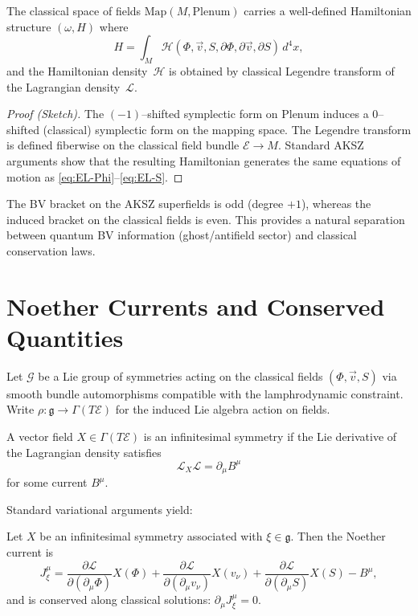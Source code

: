 \begin{proposition}
\label{prop:Hamiltonian}
The classical space of fields $\mathrm{Map}(M,\mathrm{Plenum})$
carries a well-defined Hamiltonian structure $(\omega,H)$ where
\[
H=\int_{M} \mathcal{H}(\Phi,\vec v,S,
\partial\Phi,\partial\vec v,\partial S)\,d^{4}x,
\]
and the Hamiltonian density~$\mathcal{H}$ is obtained by classical
Legendre transform of the Lagrangian density~$\mathcal{L}$.
\end{proposition}

\begin{proof}[Proof (Sketch)]
The $(-1)$--shifted symplectic form on $\mathrm{Plenum}$ induces a
$0$--shifted (classical) symplectic form on the mapping space.
The Legendre transform is defined fiberwise on the classical field
bundle $\mathcal{E}\to M$.
Standard AKSZ arguments show that the resulting Hamiltonian generates
the same equations of motion as \eqref{eq:EL-Phi}--\eqref{eq:EL-S}.
\end{proof}

\begin{remark}
The BV bracket on the AKSZ superfields is odd (degree $+1$),
whereas the induced bracket on the classical fields is even.
This provides a natural separation between quantum BV information
(ghost/antifield sector) and classical conservation laws.
\end{remark}

\section{Noether Currents and Conserved Quantities}
\label{sec:noether}

Let $\mathcal{G}$ be a Lie group of symmetries acting on the classical
fields $(\Phi,\vec v,S)$ via smooth bundle automorphisms
compatible with the lamphrodynamic constraint.
Write $\rho:\mathfrak{g}\to\Gamma(T\mathcal{E})$ for the induced Lie
algebra action on fields.

\begin{definition}
A vector field $X\in\Gamma(T\mathcal{E})$ is an infinitesimal
symmetry if the Lie derivative of the Lagrangian density satisfies
\[
\mathcal{L}_{X}\mathcal{L} = \partial_{\mu} B^{\mu}
\]
for some current $B^{\mu}$.
\end{definition}

Standard variational arguments yield:

\begin{proposition}
\label{prop:noether-current}
Let $X$ be an infinitesimal symmetry associated with $\xi\in\mathfrak{g}$.
Then the Noether current is
\[
J^{\mu}_{\xi}
= \frac{\partial\mathcal{L}}{\partial(\partial_{\mu}\Phi)}X(\Phi)
 +\frac{\partial\mathcal{L}}{\partial(\partial_{\mu}v_{\nu})}X(v_{\nu})
 +\frac{\partial\mathcal{L}}{\partial(\partial_{\mu}S)}X(S)
 - B^{\mu},
\]
and is conserved along classical solutions:
$\partial_{\mu}J^{\mu}_{\xi}=0$.
\end{proposition}

